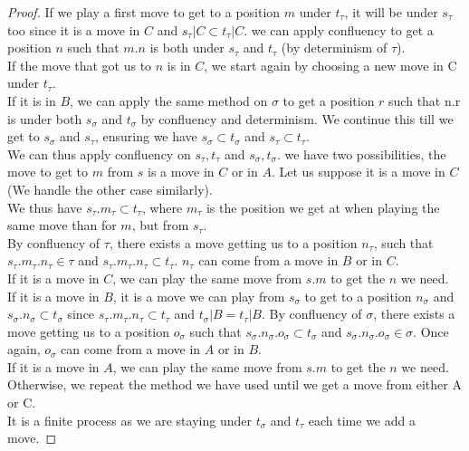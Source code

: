\documentclass[a4paper,UKenglish]{lipics}
\begin{document}
\begin{proof}
If we play a first move to get to a position $m$ under $t_\tau$, it will be under $s_\tau$ too since it is a move in $C$ and $s_\tau|C \subset t_\tau|C$. we can apply confluency to get a position $n$ such that $m.n$ is both under $s_\tau$ and $t_\tau$ (by determinism of $\tau$).\\ If the move that got us to $n$ is in $C$, we start again by choosing a new move in C under $t_\tau$.\\ If it is in $B$, we can apply the same method on $\sigma$ to get a position $r$ such that n.r is under both $s_\sigma$ and $t_\sigma$ by confluency and determinism. We continue this till we get to $s_\sigma$ and $s_\tau$, ensuring we have  $s_\sigma \subset t_\sigma$ and $s_\tau \subset t_\tau$.\\


We can thus apply confluency on $s_\tau, t_\tau$ and $s_\sigma, t_\sigma$. 
we have two possibilities, the move to get to $m$ from $s$ is a move in $C$ or in $A$.  Let us suppose it is a move in $C$ (We handle the other case similarly).\\ We thus have $s_\tau.m_\tau \subset t_\tau$, where $m_\tau$ is the position we get at when playing the same move than for $m$, but from $s_\tau$. \\By confluency of $\tau$, there exists a move getting us to a position $n_\tau$, such that $s_\tau.m_\tau.n_\tau \in \tau$ and $s_\tau.m_\tau.n_\tau \subset t_\tau$. $n_\tau$ can come from a move in $B$ or in $C$.\\ If it is a move in $C$, we can play the same move from $s.m$ to get the $n$ we need.\\ If it is a move in $B$, it is a move we can play from $s_\sigma$ to get to a position $n_\sigma$ and $s_\sigma.n_\sigma \subset t_\sigma$ since $s_\tau.m_\tau.n_\tau \subset t_\tau$ and $t_\sigma|B=t_\tau|B$. By confluency of $\sigma$, there exists a move getting us to a position $o_\sigma$ such that $s_\sigma.n_\sigma.o_\sigma \subset t_\sigma$ and 
$s_\sigma.n_\sigma.o_\sigma \in \sigma$. Once again, $o_\sigma$ can come from a move in $A$ or in $B$.\\ If it is a move in $A$, we can play the same move from $s.m$ to get the $n$ we need.\\ Otherwise, we repeat the method we have used until we get a move from either A or C. \\It is a finite process as we are staying under $t_\sigma$ and $t_\tau$ each time we add a move.



\end{proof}
\end{document}
